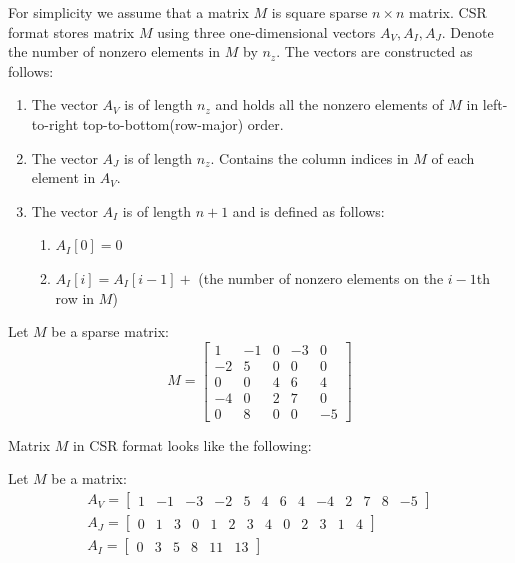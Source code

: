 \documentclass[en]{minipw} %
\begin{document}
For simplicity we assume that a matrix $M$ is square sparse $n \times n$ matrix. CSR format stores matrix $M$ using three one-dimensional vectors $A_{V}, A_{I}, A_{J}$. Denote the number of nonzero elements in $M$ by $n_{z}$. The vectors are constructed as follows:
\begin{enumerate}
\item The vector $A_{V}$ is of length $n_{z}$ and holds all the nonzero elements of $M$ in left-to-right top-to-bottom(row-major) order.
\item The vector $A_{J}$ is of length $n_{z}$. Contains the column indices in $M$ of each element in $A_{V}$.
\item The vector $A_{I}$ is of length $n+1$ and is defined as follows:
\begin{enumerate}
\item $A_{I}[0] = 0$ 
\item $A_{I}[i] = A_{I}[i-1] +$ (the number of nonzero elements on the $i-1$th row in $M$)\end{enumerate}
\end{enumerate}

\begin{example}
Let $M$ be a sparse matrix:
\begin{equation}
M =
\begin{bmatrix}
1 & -1 & 0 & -3 & 0 \\
-2 & 5 & 0 & 0 & 0 \\
0 & 0 & 4 & 6 & 4 \\
-4 & 0 & 2 & 7 & 0 \\
0 & 8 & 0 & 0 & -5
\end{bmatrix}
\end{equation}

Matrix $M$ in CSR format looks like the following:

Let $M$ be a matrix:
\begin{equation}
\begin{aligned}
A_{V} =
\begin{bmatrix}
1 & -1 & -3 & -2 & 5 & 4 & 6 & 4 & -4 & 2 & 7 & 8 & -5
\end{bmatrix}
\\
A_{J} =
\begin{bmatrix}
0 & 1 & 3 & 0 & 1 & 2 & 3 & 4 & 0 & 2 & 3 & 1 & 4
\end{bmatrix}
\\
A_{I} =
\begin{bmatrix}
0 & 3 & 5 & 8 & 11 & 13
\end{bmatrix}
\end{aligned}
\end{equation}

\end{example}
\end{document}
